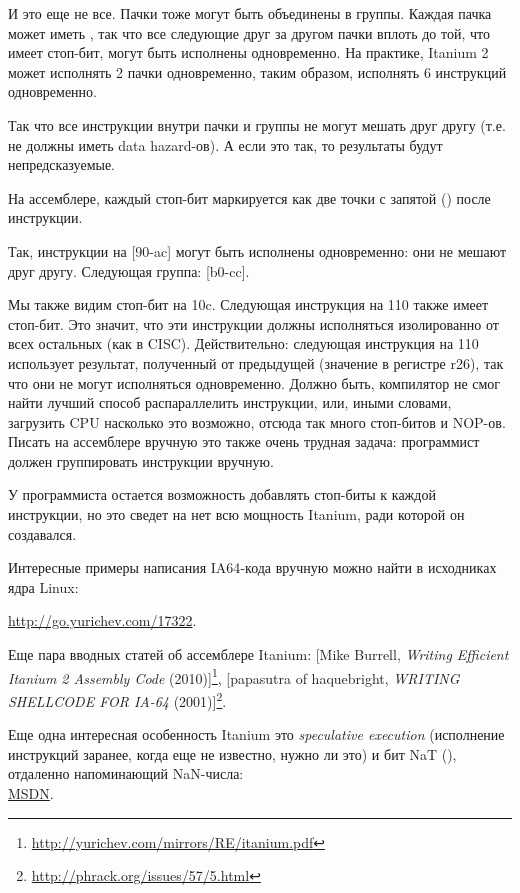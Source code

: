 И это еще не все. Пачки тоже могут быть объединены в группы.
Каждая пачка может иметь , так что все следующие друг за другом пачки вплоть до той,
что имеет стоп-бит, могут быть исполнены одновременно.
На практике, Itanium 2 может исполнять 2 пачки одновременно, таким образом, исполнять
6 инструкций одновременно.

Так что все инструкции внутри пачки и группы не могут мешать друг другу (т.е. не должны
иметь data hazard-ов).
А если это так, то результаты будут непредсказуемые.

На ассемблере, каждый стоп-бит маркируется как две точки с запятой (\TT{;;}) после инструкции.

Так, инструкции на [90-ac] могут быть исполнены одновременно: они не мешают друг другу. Следующая группа: [b0-cc].

Мы также видим стоп-бит на 10c.
Следующая инструкция на 110 также имеет стоп-бит.
Это значит, что эти инструкции должны исполняться изолированно от всех остальных (как в \ac{CISC}).
Действительно: следующая инструкция на 110 использует результат, полученный от предыдущей (значение
в регистре r26), так что они не могут исполняться одновременно.
Должно быть, компилятор не смог найти лучший способ распараллелить инструкции, или, иными
словами, загрузить \ac{CPU} насколько это возможно, отсюда так много стоп-битов и \ac{NOP}-ов.
Писать на ассемблере вручную это также очень трудная задача: программист должен группировать
инструкции вручную.

У программиста остается возможность добавлять стоп-биты к каждой инструкции, но это
сведет на нет всю мощность Itanium, ради которой он создавался.

Интересные примеры написания \ac{IA64}-кода вручную можно найти в исходниках ядра Linux:

\url{http://go.yurichev.com/17322}.

Еще пара вводных статей об ассемблере Itanium:
[Mike Burrell, \emph{Writing Efficient Itanium 2 Assembly Code} (2010)]\footnote{\AlsoAvailableAs \url{http://yurichev.com/mirrors/RE/itanium.pdf}},
[papasutra of haquebright, \emph{WRITING SHELLCODE FOR IA-64} (2001)]\footnote{\AlsoAvailableAs \url{http://phrack.org/issues/57/5.html}}.

Еще одна интересная особенность Itanium это \emph{speculative execution} (исполнение инструкций
заранее, когда еще не известно, нужно ли это) и бит NaT (), отдаленно напоминающий
\gls{NaN}-числа: \\
\href{http://go.yurichev.com/17323}{MSDN}.

